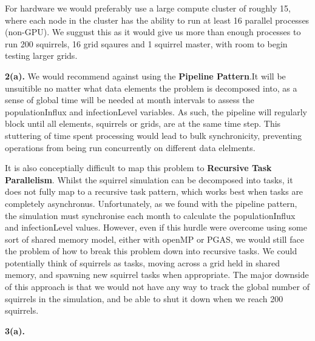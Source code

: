 \documentclass{article}
\begin{document}
For hardware we would preferably use a large compute cluster of roughly 15, where each node in the cluster has the ability to run at least 16 parallel processes (non-GPU). We suggust this as it would give us more than enough processes to run 200 squirrels, 16 grid sqaures and 1 squirrel master, with room to begin testing larger grids. \newline

\noindent\textbf{2(a).} \newline
We would recommend against using the \textbf{Pipeline Pattern}.It will be unsuitible no matter what data elements the problem is decomposed into, as a sense of global time will be needed at month intervals to assess the populationInflux and infectionLevel variables. As such, the pipeline will regularly block until all elements, squirrels or grids, are at the same time step. This stuttering of time spent processing would lead to bulk synchronicity, preventing operations from being run concurrently on different data elelments.

It is also conceptially difficult to map this problem to \textbf{Recursive Task Parallelism}. Whilst the squirrel simulation can be decomposed into tasks, it does not fully map to a recursive task pattern, which works best when tasks are completely asynchronus. Unfortunately, as we found with the pipeline pattern, the simulation must synchronise each month to calculate the populationInflux and infectionLevel values. However, even if this hurdle were overcome using some sort of shared memory model, either with openMP or PGAS, we would still face the problem of how to break this problem down into recursive tasks.  We could potentially think of squirrels as tasks, moving across a grid held in shared memory, and spawning new squirrel tasks when appropriate. The major downside of this approach is that we would not have any way to track the global number of squirrels in the simulation, and be able to shut it down when we reach 200 squirrels. \newline

\noindent\textbf{3(a).} \newline
\end{document}
